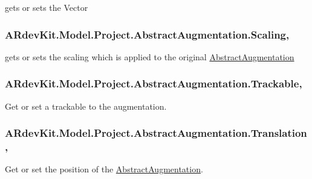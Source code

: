 gets or sets the Vector 

\hypertarget{class_a_rdev_kit_1_1_model_1_1_project_1_1_abstract_augmentation_adc3b84e8eb93f1ef50b3a689bd4c2a72}{
\subsubsection[{Scaling}]{ A\-Rdev\-Kit.\-Model.\-Project.\-Abstract\-Augmentation.\-Scaling\hspace{0.3cm}{\ttfamily [get]}, {\ttfamily [set]}}}\label{class_a_rdev_kit_1_1_model_1_1_project_1_1_abstract_augmentation_adc3b84e8eb93f1ef50b3a689bd4c2a72}


gets or sets the scaling which is applied to the original \hyperlink{class_a_rdev_kit_1_1_model_1_1_project_1_1_abstract_augmentation}{Abstract\-Augmentation} 

\hypertarget{class_a_rdev_kit_1_1_model_1_1_project_1_1_abstract_augmentation_a5ef95a16a1d2b03cb6185b86e7120a9c}{
\subsubsection[{Trackable}]{ A\-Rdev\-Kit.\-Model.\-Project.\-Abstract\-Augmentation.\-Trackable\hspace{0.3cm}{\ttfamily [get]}, {\ttfamily [set]}}}\label{class_a_rdev_kit_1_1_model_1_1_project_1_1_abstract_augmentation_a5ef95a16a1d2b03cb6185b86e7120a9c}


Get or set a trackable to the augmentation. 

\hypertarget{class_a_rdev_kit_1_1_model_1_1_project_1_1_abstract_augmentation_a8ed7943a2eb75682addda8731bff6c34}{
\subsubsection[{Translation}]{ A\-Rdev\-Kit.\-Model.\-Project.\-Abstract\-Augmentation.\-Translation\hspace{0.3cm}{\ttfamily [get]}, {\ttfamily [set]}}}\label{class_a_rdev_kit_1_1_model_1_1_project_1_1_abstract_augmentation_a8ed7943a2eb75682addda8731bff6c34}


Get or set the position of the \hyperlink{class_a_rdev_kit_1_1_model_1_1_project_1_1_abstract_augmentation}{Abstract\-Augmentation}. 

